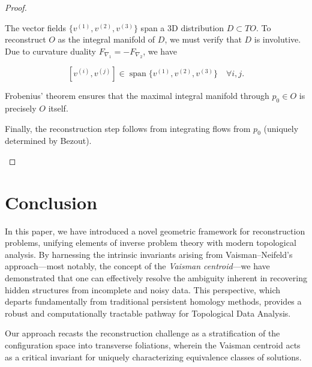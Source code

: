 \documentclass[runningheads]{llncs}
\begin{document}
\begin{proof}
\begin{enumerate}
\medskip 
The vector fields $\{v^{(1)}, v^{(2)}, v^{(3)}\}$  span a 3D distribution $D\subset TO$. To reconstruct $O$ as the integral manifold of $D$, we must verify that $D$ is involutive. Due to curvature duality $F_{\nabla_1} = -F_{\nabla_2}$, we have 

\[
[v^{(i)}, v^{(j)}] \in \operatorname{span} \{ v^{(1)}, v^{(2)}, v^{(3)}\} \quad \forall i,j. 
\]

Frobenius' theorem ensures that the maximal integral manifold through $p_0\in O$ is precisely $O$ itself.

\medskip 
Finally, the reconstruction step follows from integrating flows from $p_0$ (uniquely determined by Bezout).  
\end{enumerate}
\end{proof}



\section{Conclusion}
In this paper, we have introduced a novel geometric framework for reconstruction problems, unifying elements of inverse problem theory with modern topological analysis. By harnessing the intrinsic invariants arising from Vaisman--Neifeld’s approach---most notably, the concept of the \emph{Vaisman centroid}---we have demonstrated that one can effectively resolve the ambiguity inherent in recovering hidden structures from incomplete and noisy data. This perspective, which departs fundamentally from traditional persistent homology methods, provides a robust and computationally tractable pathway for Topological Data Analysis.

Our approach recasts the reconstruction challenge as a stratification of the configuration space into transverse foliations, wherein the Vaisman centroid acts as a critical invariant for uniquely characterizing equivalence classes of solutions. %
\end{document}
